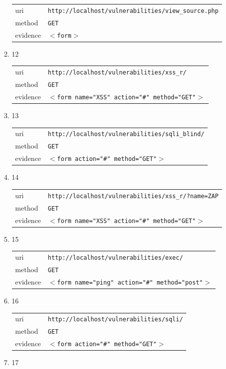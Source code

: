 \documentclass[10pt]{article}
\begin{document}
\begin{itemize}
\begin{enumerate}
\begin{tabular}{| l | p{12cm}}
uri & \texttt{http://localhost/vulnerabilities/view\_source.php} \\
method & \texttt{GET} \\
evidence & \texttt{$<$form$>$} \\
\end{tabular}
\item[] 12
\begin{tabular}{| l | p{12cm}}
uri & \texttt{http://localhost/vulnerabilities/xss\_r/} \\
method & \texttt{GET} \\
evidence & \texttt{$<$form name="XSS" action="\#" method="GET"$>$} \\
\end{tabular}
\item[] 13
\begin{tabular}{| l | p{12cm}}
uri & \texttt{http://localhost/vulnerabilities/sqli\_blind/} \\
method & \texttt{GET} \\
evidence & \texttt{$<$form action="\#" method="GET"$>$} \\
\end{tabular}
\item[] 14
\begin{tabular}{| l | p{12cm}}
uri & \texttt{http://localhost/vulnerabilities/xss\_r/?name=ZAP} \\
method & \texttt{GET} \\
evidence & \texttt{$<$form name="XSS" action="\#" method="GET"$>$} \\
\end{tabular}
\item[] 15
\begin{tabular}{| l | p{12cm}}
uri & \texttt{http://localhost/vulnerabilities/exec/} \\
method & \texttt{GET} \\
evidence & \texttt{$<$form name="ping" action="\#" method="post"$>$} \\
\end{tabular}
\item[] 16
\begin{tabular}{| l | p{12cm}}
uri & \texttt{http://localhost/vulnerabilities/sqli/} \\
method & \texttt{GET} \\
evidence & \texttt{$<$form action="\#" method="GET"$>$} \\
\end{tabular}
\item[] 17
\begin{tabular}{| l | p{12cm}}

\end{tabular}
\end{enumerate}
\end{itemize}
\end{document}
